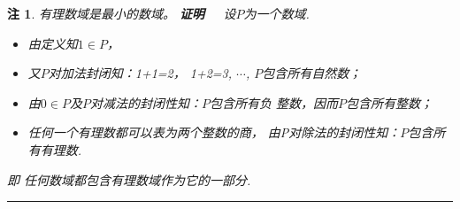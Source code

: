 \documentclass[13pt,fontset=mac]{ctexbeamer}
\newtheorem*{rem}{注}
\def\qed{\nopagebreak\hfill{\rule{4pt}{7pt}}\medbreak}
\def\pf{{\bf 证明~~ }}
\begin{document}
\begin{frame}
\begin{rem}
有理数域是最小的数域。
\pf
设$P$为一个数域.
\begin{itemize}
    \item 由定义知$1\in P$，
    \item 又$P$对加法封闭知：1+1=2，
1+2=3, $\cdots$,  $P$包含所有\alert{自然数}；
	\item 由$0\in P$及$P$对减法的封闭性知：$P$包含所有负
整数，因而$P$包含所有\alert{整数}；
\item 
任何一个有理数都可以表为两个整数的商，
由P对除法的封闭性知：$P$包含所有\alert{有理数}.

\end{itemize}

即
    任何数域都包含有理数域作为它的一部分.

\qed
\end{rem}

\end{frame}
\end{document}
